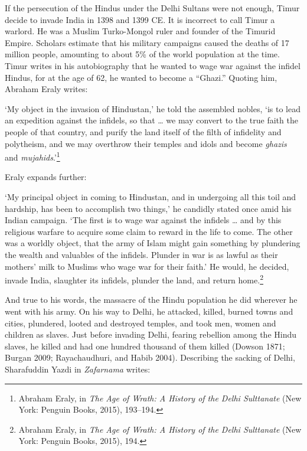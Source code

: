 If the persecution of the Hindus under the Delhi Sultans were not enough, Timur decide to invade India in 1398 and 1399 CE. It is incorrect to call Timur a warlord. He was a Muslim Turko-Mongol ruler and founder of the Timurid Empire. Scholars estimate that his military campaigns caused the deaths of 17 million people, amounting to about 5\% of the world population at the time. Timur writes in his autobiography that he wanted to wage war against the infidel Hindus, for at the age of 62, he wanted to become a “Ghazi.” Quoting him, Abraham Eraly writes: 

‘My object in the invasion of Hindustan,’ he told the assembled nobles, ‘is to lead an expedition against the infidels, so that … we may convert to the true faith the people of that country, and purify the land itself of the filth of infidelity and polytheism, and we may overthrow their temples and idols and become \textit{ghazis} and \textit{mujahids}.’\footnote{Abraham Eraly, in \textit{The Age of Wrath: A History of the Delhi Sulttanate} (New York: Penguin Books, 2015), 193--194.}

Eraly expands further:

‘My principal object in coming to Hindustan, and in undergoing all this toil and hardship, has been to accomplish two things,’ he candidly stated once amid his Indian campaign. ‘The first is to wage war against the infidels … and by this religious warfare to acquire some claim to reward in the life to come. The other was a worldly object, that the army of Islam might gain something by plundering the wealth and valuables of the infidels. Plunder in war is as lawful as their mothers’ milk to Muslims who wage war for their faith.’ He would, he decided, invade India, slaughter its infidels, plunder the land, and return home.\footnote{Abraham Eraly, in \textit{The Age of Wrath: A History of the Delhi Sulttanate} (New York: Penguin Books, 2015), 194.}

And true to his words, the massacre of the Hindu population he did wherever he went with his army. On his way to Delhi, he attacked, killed, burned towns and cities, plundered, looted and destroyed temples, and took men, women and children as slaves. Just before invading Delhi, fearing rebellion among the Hindu slaves, he killed and had one hundred thousand of them killed (Dowson 1871; Burgan 2009; Rayachaudhuri, and Habib 2004). Describing the sacking of Delhi, Sharafuddin Yazdi in \textit{Zafarnama} writes: 

